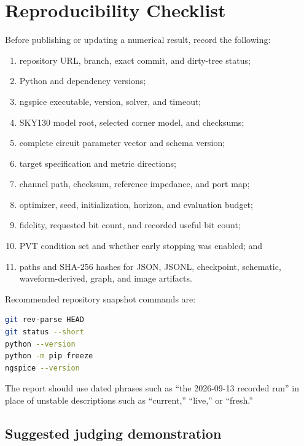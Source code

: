 \chapter{Reproducibility Checklist}
\label{app:reproducibility}

Before publishing or updating a numerical result, record the following:

\begin{enumerate}
  \item repository URL, branch, exact commit, and dirty-tree status;
  \item Python and dependency versions;
  \item ngspice executable, version, solver, and timeout;
  \item SKY130 model root, selected corner model, and checksums;
  \item complete circuit parameter vector and schema version;
  \item target specification and metric directions;
  \item channel path, checksum, reference impedance, and port map;
  \item optimizer, seed, initialization, horizon, and evaluation budget;
  \item fidelity, requested bit count, and recorded useful bit count;
  \item PVT condition set and whether early stopping was enabled; and
  \item paths and SHA-256 hashes for JSON, JSONL, checkpoint, schematic,
        waveform-derived, graph, and image artifacts.
\end{enumerate}

Recommended repository snapshot commands are:

\begin{lstlisting}[language=bash]
git rev-parse HEAD
git status --short
python --version
python -m pip freeze
ngspice --version
\end{lstlisting}

The report should use dated phrases such as ``the 2026-09-13 recorded run'' in
place of unstable descriptions such as ``current,'' ``live,'' or ``fresh.''

\section{Suggested judging demonstration}

